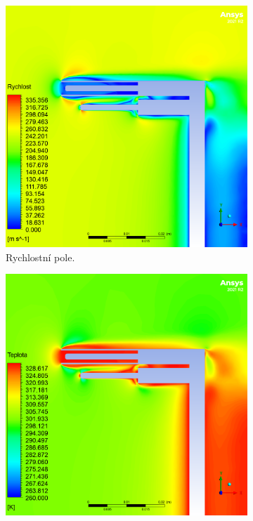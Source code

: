             \begin{figure}[ht!]
                \centering
                \begin{subfigure}{0.45\textwidth}
                    \centering
                    \captionsetup{width=.9\linewidth}
                    \includegraphics[width=\textwidth]{400_SIMULACE_KONSTRUKCNICH_UPRAV/Vizualizace/sonda_bez_stineni_vizualizace_rychlost.png}
                    \caption{Rychlostní pole.}
                \end{subfigure}
                \begin{subfigure}{0.45\textwidth}
                    \centering
                    \captionsetup{width=.9\linewidth}
                    \includegraphics[width=\textwidth]{400_SIMULACE_KONSTRUKCNICH_UPRAV/Vizualizace/sonda_bez_stineni_vizualizace_teplota.png}

\end{subfigure}
\end{figure}
